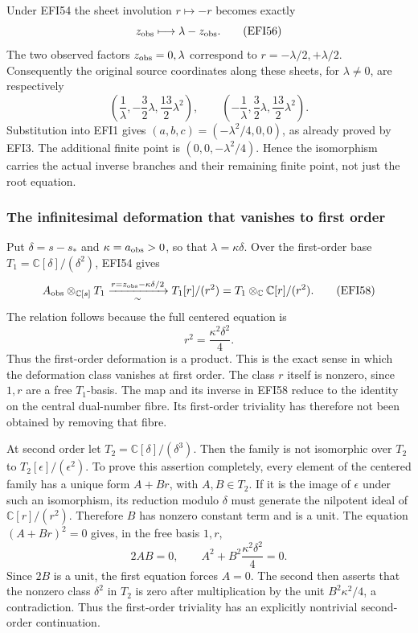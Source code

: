 \documentclass[
  10pt,
  a4paper,
]{article}
\begin{document}
Under EFI54 the sheet involution \(r\mapsto-r\) becomes exactly \[
z_{\rm obs}\longmapsto\lambda-z_{\rm obs}.
\tag{EFI56}
\] The two observed factors \(z_{\rm obs}=0,\lambda\) correspond to
\(r=-\lambda/2,+\lambda/2\). Consequently the original source
coordinates along these sheets, for \(\lambda\ne0\), are respectively \[
\left(\frac1\lambda,-\frac32\lambda,\frac{13}2\lambda^2\right),
\qquad
\left(-\frac1\lambda,\frac32\lambda,\frac{13}2\lambda^2\right).
\tag{EFI57}
\] Substitution into EFI1 gives \((a,b,c)=(-\lambda^2/4,0,0)\), as
already proved by EFI3. The additional finite point is
\((0,0,-\lambda^2/4)\). Hence the isomorphism carries the actual inverse
branches and their remaining finite point, not just the root equation.

\subsubsection{The infinitesimal deformation that vanishes to first
order}\label{the-infinitesimal-deformation-that-vanishes-to-first-order}

Put \(\delta=s-s_*\) and \(\kappa=a_{\rm obs}>0\), so that
\(\lambda=\kappa\delta\). Over the first-order base
\(T_1=\mathbb C[\delta]/(\delta^2)\), EFI54 gives \[
A_{\rm obs}\otimes_{\mathbb C[s]}T_1
\xrightarrow[\sim]{r=z_{\rm obs}-\kappa\delta/2}
T_1[r]/(r^2)
 =T_1\otimes_{\mathbb C}\mathbb C[r]/(r^2).
\tag{EFI58}
\] The relation follows because the full centered equation is \[
r^2=\frac{\kappa^2\delta^2}{4}.
\tag{EFI59}
\] Thus the first-order deformation is a product. This is the exact
sense in which the deformation class vanishes at first order. The class
\(r\) itself is nonzero, since \(1,r\) are a free \(T_1\)-basis. The map
and its inverse in EFI58 reduce to the identity on the central
dual-number fibre. Its first-order triviality has therefore not been
obtained by removing that fibre.

At second order let \(T_2=\mathbb C[\delta]/(\delta^3)\). Then the
family is not isomorphic over \(T_2\) to \(T_2[\epsilon]/(\epsilon^2)\).
To prove this assertion completely, every element of the centered family
has a unique form \(A+B r\), with \(A,B\in T_2\). If it is the image of
\(\epsilon\) under such an isomorphism, its reduction modulo \(\delta\)
must generate the nilpotent ideal of \(\mathbb C[r]/(r^2)\). Therefore
\(B\) has nonzero constant term and is a unit. The equation
\((A+Br)^2=0\) gives, in the free basis \(1,r\), \[
2AB=0,\qquad
A^2+B^2\frac{\kappa^2\delta^2}{4}=0.
\tag{EFI60}
\] Since \(2B\) is a unit, the first equation forces \(A=0\). The second
then asserts that the nonzero class \(\delta^2\) in \(T_2\) is zero
after multiplication by the unit \(B^2\kappa^2/4\), a contradiction.
Thus the first-order triviality has an explicitly nontrivial
second-order continuation.
\end{document}
